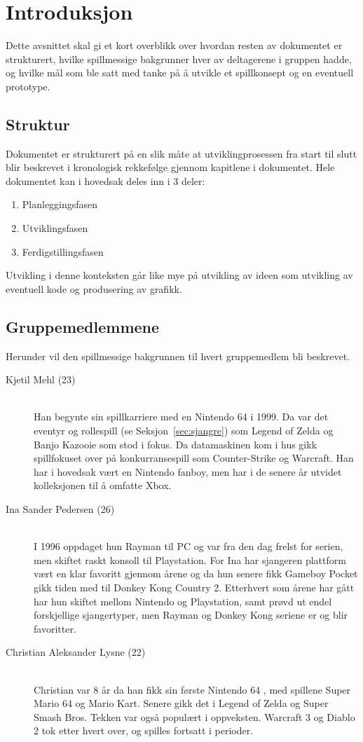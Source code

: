 \section{Introduksjon}
Dette avsnittet skal gi et kort overblikk over hvordan resten av
dokumentet er strukturert, hvilke spillmessige bakgrunner hver av
deltagerene i gruppen hadde, og hvilke mål som ble satt med tanke på å
utvikle et spillkonsept og en eventuell prototype.
\subsection{Struktur}
Dokumentet er strukturert på en slik måte at utviklingprosessen fra
start til slutt blir beskrevet i kronologisk rekkefølge gjennom
kapitlene i dokumentet. Hele dokumentet kan i hovedsak deles inn i 3
deler:
\begin{enumerate}
	\item Planleggingsfasen
	\item Utviklingsfasen
	\item Ferdigstillingsfasen
\end{enumerate}
Utvikling i denne konteksten går like mye på utvikling av ideen som
utvikling av eventuell kode og produsering av grafikk.
\subsection{Gruppemedlemmene}
Herunder vil den spillmessige bakgrunnen til hvert gruppemedlem bli
beskrevet.
\begin{description}
\item[Kjetil Mehl (23)] \hfill \\
Han begynte sin spillkarriere med en Nintendo 64\cite{n64} i 1999. Da
var det eventyr og rollespill (se Seksjon~\ref{sec:sjangre}) som Legend
of Zelda\cite{legendofzelda} og Banjo Kazooie\cite{banjokazooie} som
stod i fokus. Da datamaskinen kom i hus gikk spillfokuset  over på
konkurransespill som Counter-Strike og Warcraft. Han har i hovedsak vært
en Nintendo fanboy\cite{fanboy}, men har i de senere år utvidet
kolleksjonen til å omfatte Xbox.
\item[Ina Sander Pedersen (26)] \hfill \\
I 1996 oppdaget hun Rayman\cite{rayman} til PC og var fra den dag frelst for serien, men skiftet raskt konsoll til Playstation. For Ina har sjangeren plattform vært en klar favoritt gjennom årene og da hun senere fikk Gameboy Pocket\cite{gameboy} gikk tiden med til Donkey Kong Country 2\cite{DKC2}. Etterhvert som årene har gått har hun skiftet mellom Nintendo og Playstation, samt prøvd ut endel forskjellige sjangertyper, men Rayman og Donkey Kong seriene er og blir favoritter. 
\item[Christian Aleksander Lysne (22)] \hfill \\
Christian var 8 år da han fikk sin første Nintendo 64\cite{n64} , med spillene Super Mario 64\cite{mario64} og Mario Kart\cite{mariokart}. Senere gikk det i Legend of Zelda\cite{legendofzelda} og Super Smash Bros\cite{smash}. Tekken\cite{tekken} var også  populært i oppveksten. Warcraft 3\cite{wc3} og Diablo 2\cite{diablo2} tok etter hvert over, og spilles fortsatt i perioder.
\end{description}
